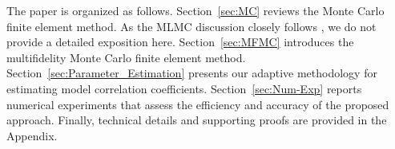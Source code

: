 The paper is organized as follows. Section~\ref{sec:MC} reviews the Monte Carlo finite element method. As the MLMC discussion closely follows \cite{ElLiSa:2025}, we do not provide a detailed exposition here. Section~\ref{sec:MFMC} introduces the multifidelity Monte Carlo finite element method. Section~\ref{sec:Parameter_Estimation} presents our adaptive methodology for estimating model correlation coefficients. Section~\ref{sec:Num-Exp} reports numerical experiments that assess the efficiency and accuracy of the proposed approach. Finally, technical details and supporting proofs are provided in the Appendix.

 




% 


